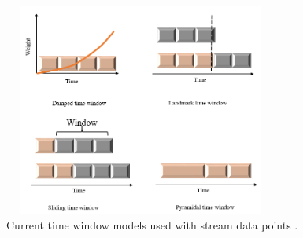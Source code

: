 
\begin{figure}[!h]
\centering
\includegraphics[width = 9cm,height = 7cm]{image/timeW.PNG}
\caption{Current time window models used with stream data points \protect\cite{carnein2019optimizing}.}
\label{time1}
\end{figure}




